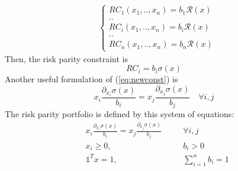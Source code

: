 \begin{equation}\label{eq:1}
\begin{aligned}
&\begin{cases}
RC_1(x_1,..,x_n) = b_1 \mathcal{R}(x)\\
..\\
RC_i(x_1,..,x_n) = b_i \mathcal{R}(x)\\
..\\
RC_n(x_1,..,x_n) = b_n \mathcal{R}(x)
\end{cases}
\end{aligned}
\end{equation} Then, the risk parity constraint is
\begin{equation}\label{eq:newconst}
RC_i = b_i \sigma (x)
\end{equation}
Another useful formulation of (\ref{eq:newconst}) is
\begin{equation}\label{eq:newconst1}
x_i \frac{\partial_{x_i} \sigma (x)}{b_i} = x_j \frac{\partial_{x_j} \sigma (x)}{b_j} \hspace{1em} \forall i,j
\end{equation}
The risk parity portfolio \cite{roncalli} is defined by this system of equations:
\begin{equation}\label{eq:rb}
\begin{aligned}
&x_i \frac{\partial_{x_i} \sigma (x)}{b_i} = x_j \frac{\partial_{x_j} \sigma (x)}{b_j} \hspace{1em} &&\forall i,j\\
&x_i \geq 0,  &&b_i > 0 \\
&\mathds{1}^T x = 1,  &&\sum_{i=1}^n b_i = 1
\end{aligned}
\end{equation}

